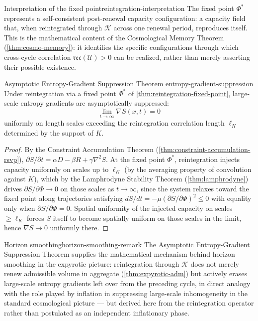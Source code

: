 \documentclass[12pt,twoside,openright]{book}
\newcommand{\reco}{\mathfrak{rec}}
\begin{document}
\begin{remark}{Interpretation of the fixed point}{reintegration-interpretation}
  The fixed point $\Phi^*$ represents a self-consistent
  post-renewal capacity configuration: a capacity field
  that, when reintegrated through $\mathcal{K}$ across one
  renewal period, reproduces itself. This is the
  mathematical content of the Cosmological Memory Theorem
  (\cref{thm:cosmo-memory}): it identifies the specific
  configurations through which cross-cycle correlation
  $\reco(\mathcal{U})>0$ can be realized, rather than merely
  asserting their possible existence.
\end{remark}

\begin{theorem}{Asymptotic Entropy-Gradient Suppression Theorem}%
  {entropy-gradient-suppression}
  Under reintegration via a fixed point $\Phi^*$ of
  \cref{thm:reintegration-fixed-point}, large-scale entropy
  gradients are asymptotically suppressed:
  \[
    \lim_{t\to\infty} \nabla S(x,t) = 0
  \]
  uniformly on length scales exceeding the reintegration
  correlation length $\ell_K$ determined by the support of
  $K$.
\end{theorem}

\begin{proof}
  By the Constraint Accumulation Theorem
  (\cref{thm:constraint-accumulation-rsvp}),
  $\partial S/\partial t = \alpha D - \beta R + \gamma\nabla^2 S$.
  At the fixed point $\Phi^*$, reintegration injects capacity
  uniformly on scales up to $\ell_K$ (by the averaging
  property of convolution against $K$), which by the
  Lamphrodyne Stability Theorem (\cref{thm:lamphrodyne})
  drives $\partial S/\partial\Phi \to 0$ on those scales as
  $t\to\infty$, since the system relaxes toward the fixed
  point along trajectories satisfying
  $dS/dt = -\mu(\partial S/\partial\Phi)^2 \le 0$ with
  equality only when $\partial S/\partial\Phi = 0$. Spatial
  uniformity of the injected capacity on scales $\ge\ell_K$
  forces $S$ itself to become spatially uniform on those
  scales in the limit, hence $\nabla S \to 0$ uniformly
  there.
\end{proof}

\begin{remark}{Horizon smoothing}{horizon-smoothing-remark}
  The Asymptotic Entropy-Gradient Suppression Theorem
  supplies the mathematical mechanism behind horizon
  smoothing in the expyrotic picture: reintegration through
  $\mathcal{K}$ does not merely renew admissible volume in
  aggregate (\cref{thm:expyrotic-adm}) but actively erases
  large-scale entropy gradients left over from the
  preceding cycle, in direct analogy with the role played by
  inflation in suppressing large-scale inhomogeneity in the
  standard cosmological picture --- but derived here from
  the reintegration operator rather than postulated as an
  independent inflationary phase.
\end{remark}
\end{document}
